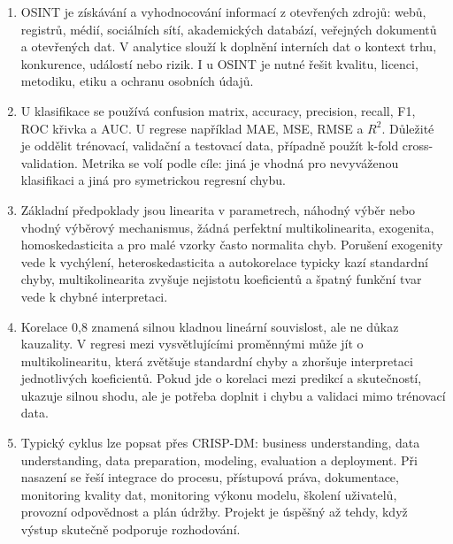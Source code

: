 \documentclass[12pt,a4paper]{article}
\begin{document}
\begin{enumerate}
  \item {}

  OSINT je získávání a vyhodnocování informací z otevřených zdrojů: webů, registrů, médií, sociálních
  sítí, akademických databází, veřejných dokumentů a otevřených dat. V analytice slouží k doplnění
  interních dat o kontext trhu, konkurence, událostí nebo rizik. I u OSINT je nutné řešit kvalitu,
  licenci, metodiku, etiku a ochranu osobních údajů.

  \item {}

  U klasifikace se používá confusion matrix, accuracy, precision, recall, F1, ROC křivka a AUC.
  U regrese například MAE, MSE, RMSE a $R^2$. Důležité je oddělit trénovací, validační a testovací
  data, případně použít k-fold cross-validation. Metrika se volí podle cíle: jiná je vhodná pro
  nevyváženou klasifikaci a jiná pro symetrickou regresní chybu.

  \item {}

  Základní předpoklady jsou linearita v parametrech, náhodný výběr nebo vhodný výběrový mechanismus,
  žádná perfektní multikolinearita, exogenita, homoskedasticita a pro malé vzorky často normalita
  chyb. Porušení exogenity vede k vychýlení, heteroskedasticita a autokorelace typicky kazí standardní
  chyby, multikolinearita zvyšuje nejistotu koeficientů a špatný funkční tvar vede k chybné
  interpretaci.

  \item {}

  Korelace 0,8 znamená silnou kladnou lineární souvislost, ale ne důkaz kauzality. V regresi mezi
  vysvětlujícími proměnnými může jít o multikolinearitu, která zvětšuje standardní chyby a zhoršuje
  interpretaci jednotlivých koeficientů. Pokud jde o korelaci mezi predikcí a skutečností, ukazuje
  silnou shodu, ale je potřeba doplnit i chybu a validaci mimo trénovací data.

  \item {}

  Typický cyklus lze popsat přes CRISP-DM: business understanding, data understanding, data preparation,
  modeling, evaluation a deployment. Při nasazení se řeší integrace do procesu, přístupová práva,
  dokumentace, monitoring kvality dat, monitoring výkonu modelu, školení uživatelů, provozní odpovědnost
  a plán údržby. Projekt je úspěšný až tehdy, když výstup skutečně podporuje rozhodování.


\end{enumerate}
\end{document}
